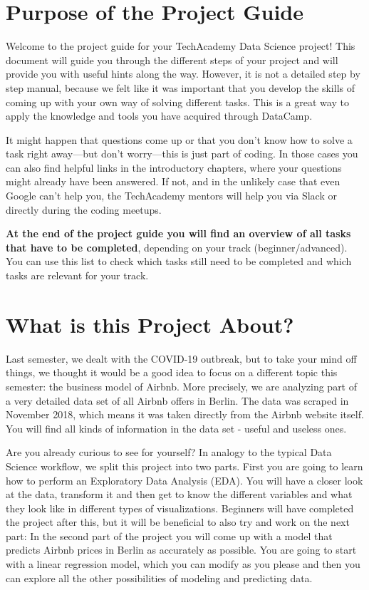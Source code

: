 \documentclass[
  11pt,
]{book}
\begin{document}
\hypertarget{purpose-of-the-project-guide}{%
\section{Purpose of the Project Guide}\label{purpose-of-the-project-guide}}

Welcome to the project guide for your TechAcademy Data Science project! This document will guide you through the different steps of your project and will provide you with useful hints along the way. However, it is not a detailed step by step manual, because we felt like it was important that you develop the skills of coming up with your own way of solving different tasks. This is a great way to apply the knowledge and tools you have acquired through DataCamp.

It might happen that questions come up or that you don't know how to solve a task right away---but don't worry---this is just part of coding. In those cases you can also find helpful links in the introductory chapters, where your questions might already have been answered. If not, and in the unlikely case that even Google can't help you, the TechAcademy mentors will help you via Slack or directly during the coding meetups.

\textbf{At the end of the project guide you will find an overview of all tasks that have to be completed}, depending on your track (beginner/advanced). You can use this list to check which tasks still need to be completed and which tasks are relevant for your track.

\hypertarget{what-is-this-project-about}{%
\section{What is this Project About?}\label{what-is-this-project-about}}

Last semester, we dealt with the COVID-19 outbreak, but to take your mind off things, we thought it would be a good idea to focus on a different topic this semester: the business model of Airbnb. More precisely, we are analyzing part of a very detailed data set of all Airbnb offers in Berlin. The data was scraped in November 2018, which means it was taken directly from the Airbnb website itself. You will find all kinds of information in the data set - useful and useless ones.

Are you already curious to see for yourself? In analogy to the typical Data Science workflow, we split this project into two parts. First you are going to learn how to perform an Exploratory Data Analysis (EDA). You will have a closer look at the data, transform it and then get to know the different variables and what they look like in different types of visualizations. Beginners will have completed the project after this, but it will be beneficial to also try and work on the next part: In the second part of the project you will come up with a model that predicts Airbnb prices in Berlin as accurately as possible. You are going to start with a linear regression model, which you can modify as you please and then you can explore all the other possibilities of modeling and predicting data.
\end{document}
